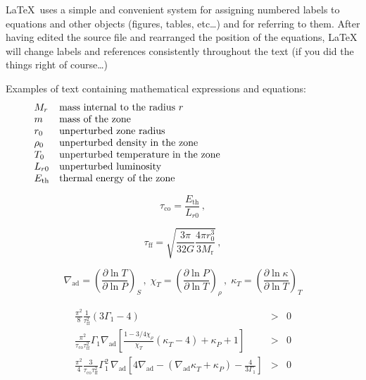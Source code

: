 \documentclass[a4paper,10pt]{article}
\begin{document}
\LaTeX\, uses a simple and convenient system for assigning numbered labels
to equations and other objects (figures, tables, etc\ldots) and for referring
to them. After having edited the source file and rearranged the position of
the equations, \LaTeX\, will  change labels and references
consistently throughout the text (if you did the things right of
course\ldots)

Examples of text containing mathematical expressions and equations:
\[
   \begin{array}{lp{0.8\linewidth}}
      M_{r}           & mass internal to the radius $r$     \\
      m               & mass of the zone                    \\
      r_0             & unperturbed zone radius             \\
      \rho_0          & unperturbed density in the zone     \\
      T_0             & unperturbed temperature in the zone \\
      L_{r0}          & unperturbed luminosity              \\
      E_{\mathrm{th}} & thermal energy of the zone
   \end{array}
\]

\noindent

\begin{equation}
   \tau_{\mathrm{co}} = \frac{E_{\mathrm{th}}}{L_{r0}} \,,
\end{equation}


\begin{equation}
   \tau_{\mathrm{ff}} =
   \sqrt{
      \frac{3 \pi}{32 G} \frac{4\pi r_0^3}{3 M_{\mathrm{r}}}
   }\,,
\end{equation}


\begin{displaymath}
   \nabla_{\mathrm{ad}} = \left( \frac{ \partial \ln T}
   { \partial\ln P} \right)_{S} \, , \;
   \chi^{}_T       = \left( \frac{ \partial \ln P}
   { \partial\ln T} \right)_{\rho} \, , \;
   \kappa^{}_{T}   = \left( \frac{ \partial \ln \kappa}
   { \partial\ln T} \right)_{T}
\end{displaymath}

\begin{eqnarray}
   \frac{\pi^2}{8} \frac{1}{\tau_{\mathrm{ff}}^2}
   ( 3 \Gamma_1 - 4 )
   & > & 0 \label{ZSDynSta} \\
   \frac{\pi^2}{\tau_{\mathrm{co}}
      \tau_{\mathrm{ff}}^2}
   \Gamma_1 \nabla_{\mathrm{ad}}
   \left[ \frac{ 1- 3/4 \chi^{}_\rho }{ \chi^{}_T }
      ( \kappa^{}_T - 4 )
      + \kappa^{}_P + 1
      \right]
   & > & 0 \label{ZSSecSta} \\
   \frac{\pi^2}{4} \frac{3}{\tau_{ \mathrm{co} }
      \tau_{ \mathrm{ff} }^2
   }
   \Gamma_1^2 \, \nabla_{\mathrm{ad}} \left[
      4 \nabla_{\mathrm{ad}}
      - ( \nabla_{\mathrm{ad}} \kappa^{}_T
      + \kappa^{}_P
      )
      - \frac{4}{3 \Gamma_1}
      \right]
   & > & 0   \label{ZSVibSta}
\end{eqnarray}
\end{document}
